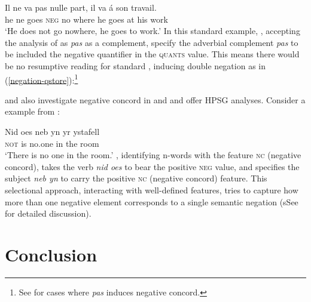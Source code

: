 \documentclass[output=paper
	        ,collection
	        ,collectionchapter
 	        ,biblatex
                ,babelshorthands
                ,newtxmath
                ,draftmode
                ,colorlinks, citecolor=brown
]{langscibook}
\begin{document}
\begin{exe}
\begin{xlist}
\ea
\gll Il ne va pas nulle part,         il va \'{a} son travail.\\
     he ne goes \textsc{neg} no where he goes at  his work\\
\glt `He does not go nowhere, he goes to work.'
\z
%
In this standard  example, \citet{Swart:02}, accepting
the analysis of \citet{Kim:00} as \textit{pas} as a complement,
specify the adverbial complement \emph{pas} to be included the negative quantifier in the \textsc{quants} value.
 This means there would be no resumptive
reading for standard , inducing double negation as in (\ref{negation-qstore}):\footnote{See \citet{Swart:02} for cases where \textit{pas} induces negative concord.}

\ea
\label{negation-qstore}
\z

\citet{PK:99} and \citet{BJ:00} also  investigate negative concord in  and 
and offer HPSG analyses. Consider a  example from \citet{BJ:00}:

\ea
\gll Nid         oes neb yn yr ystafell\\
\textsc{not}    is no.one in the room\\
\glt `There is no one in the room.'
\z
\noindent \citet{BJ:00}, identifying n-words with the feature
\textsc{nc} (negative
concord),  takes the verb \emph{nid oes} to bear the positive \textsc{neg} value,
and specifies the subject \emph{neb yn} to carry the positive \textsc{nc} (negative
concord) feature. This selectional approach, interacting with
well-defined features, tries to capture how more than one
negative element corresponds to a single semantic negation (sSee
\citet{BJ:00} for detailed discussion).



\section{Conclusion}





\end{xlist}
\end{exe}
\end{document}
